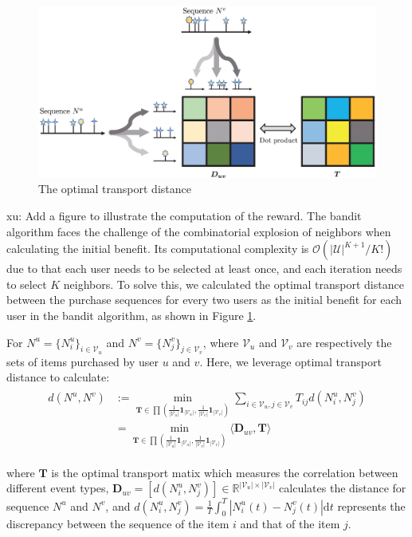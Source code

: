 \documentclass[runningheads]{llncs}
\newcommand{\dd}{\mathrm{d}}
\newcommand{\xu}[1]{{\color{red} xu: #1}}
\begin{document}
\begin{figure}[htbp]
\centerline{\includegraphics[scale=0.4]{figure2.eps}}
\caption{The optimal transport distance}
\label{fig2}
\end{figure}

\xu{Add a figure to illustrate the computation of the reward.}
The bandit algorithm faces the challenge of the combinatorial explosion of neighbors when calculating the initial benefit. Its computational complexity is $\mathcal{O}(|\mathcal{U}|^{K+1} / K!)$ due to that each user needs to be selected at least once, and each iteration needs to select $K$ neighbors. To solve this, we calculated the optimal transport distance between the purchase sequences for every two users as the initial benefit for each user in the bandit algorithm, as shown in Figure \ref{fig2}.

For $N^u=\{N_i^u \}_{i \in \mathcal{V}_u}$ and $N^v=\{N_j^v\}_{j \in \mathcal{V}_v}$, where $\mathcal{V}_u$ and $\mathcal{V}_v$ are respectively the sets of items purchased by user $u$ and $v$. Here, we leverage optimal transport distance to calculate:
\begin{eqnarray}
\begin{aligned}
d(N^u, N^v) 
& := \min_{\bm{T} \in \prod (\frac{1}{|\mathcal{V}_u|} \bm{1}_{|\mathcal{V}_u|}, \frac{1}{|\mathcal{V}_v|} \bm{1}_{|\mathcal{V}_v|})} \sum_{i \in \mathcal{V}_u, j \in \mathcal{V}_v} T_{ij} d(N_i^u, N_j^v)\\
&= \min_{\bm{T} \in \prod (\frac{1}{|\mathcal{V}_u|} \bm{1}_{|\mathcal{V}_u|}, \frac{1}{|\mathcal{V}_v|} \bm{1}_{|\mathcal{V}_v|})} \langle \bm{D}_{uv}, \bm{T} \rangle 
\end{aligned}    
\end{eqnarray}

where $\bm{T}$ is the optimal transport matix which measures the correlation between different event types, $\bm{D}_{uv}=[d(N_i^u, N_j^v)] \in \mathbb{R}^{|\mathcal{V}_u| \times |\mathcal{V}_v| }$ calculates the distance for sequence $N^u$ and $N^v$, and $d(N_i^u, N_j^v) = \frac{1}{T} \int_0^T|N_i^u(t) - N_j^v(t)| \dd t$ represents the discrepancy between the sequence of the item $i$ and that of the item $j$.
\end{document}
